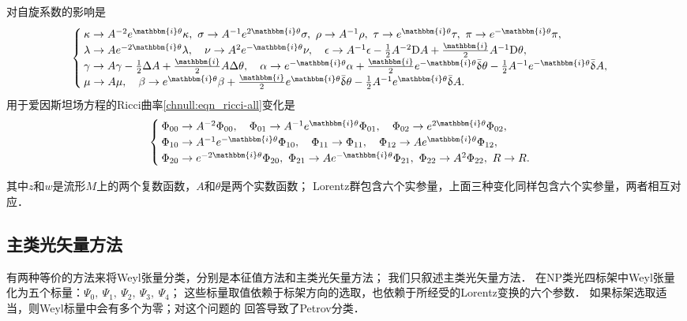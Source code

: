 对自旋系数的影响是
\begin{equation}\label{chnull:eqn_Spin-III}
    \begin{cases}
        \kappa\to A^{-2} e^{\mathbbm{i}\theta}\kappa,\
        \sigma\to A^{-1} e^{2\mathbbm{i}\theta}\sigma,\
        \rho \to A^{-1}\rho, \
        \tau \to e^{\mathbbm{i}\theta} \tau, \
        \pi \to e^{-\mathbbm{i}\theta} \pi,\\
        \lambda \to A e^{-2\mathbbm{i}\theta} \lambda,\quad
        \nu \to A^2 e^{-\mathbbm{i}\theta} \nu, \quad
        \epsilon\to A^{-1} \epsilon -\frac{1}{2}A^{-2}{\rm D}A
        + \frac{\mathbbm{i}}{2} A^{-1} {\rm D}\theta,       \\
        \gamma\to A \gamma -\frac{1}{2}\Delta A+ \frac{\mathbbm{i}}{2} A \Delta \theta,\quad
        \alpha\to e^{-\mathbbm{i}\theta}\alpha + \frac{\mathbbm{i}}{2} e^{-\mathbbm{i}\theta}
        \bar{\updelta}\theta -\frac{1}{2} A^{-1} e^{-\mathbbm{i}\theta}\bar{\updelta}A, \\
        \mu\to A\mu, \quad
        \beta\to e^{\mathbbm{i}\theta}\beta + \frac{\mathbbm{i}}{2} e^{\mathbbm{i}\theta}
        \bar{\updelta}\theta -\frac{1}{2} A^{-1} e^{\mathbbm{i}\theta}\bar{\updelta}A.
    \end{cases}
\end{equation}  %
用于爱因斯坦场方程的Ricci曲率\eqref{chnull:eqn_ricci-all}变化是
\begin{equation}\label{chnull:eqn_Einstein-III}
    \begin{cases}
        \Phi_{00}\to A^{-2} \Phi_{00} , \quad
        \Phi_{01}\to A^{-1} e^{\mathbbm{i}\theta} \Phi_{01}  , \quad
        \Phi_{02}\to e^{2\mathbbm{i}\theta} \Phi_{02}  , \\
        \Phi_{10}\to A^{-1} e^{-\mathbbm{i}\theta} \Phi_{10} , \quad
        \Phi_{11}\to \Phi_{11}, \quad
        \Phi_{12}\to A e^{\mathbbm{i}\theta} \Phi_{12}  , \\
        \Phi_{20}\to e^{-2\mathbbm{i}\theta} \Phi_{20}  , \
        \Phi_{21}\to A e^{-\mathbbm{i}\theta} \Phi_{21}  , \
        \Phi_{22}\to A^2 \Phi_{22}    , \
        R\to R.
    \end{cases}
\end{equation}



其中$z$和$w$是流形$M$上的两个复数函数，$A$和$\theta$是两个实数函数；
Lorentz群包含六个实参量，上面三种变化同样包含六个实参量，两者相互对应．


\subsection{主类光矢量方法}
有两种等价的方法来将Weyl张量分类，分别是本征值方法和主类光矢量方法；
我们只叙述主类光矢量方法．
在NP类光四标架中Weyl张量化为五个标量：$\Psi_0,\ \Psi_1,\ \Psi_2,\ \Psi_3,\ \Psi_4$；
这些标量取值依赖于标架方向的选取，也依赖于所经受的Lorentz变换的六个参数．
如果标架选取适当，则Weyl标量中会有多个为零；对这个问题的
回答导致了Petrov分类．


